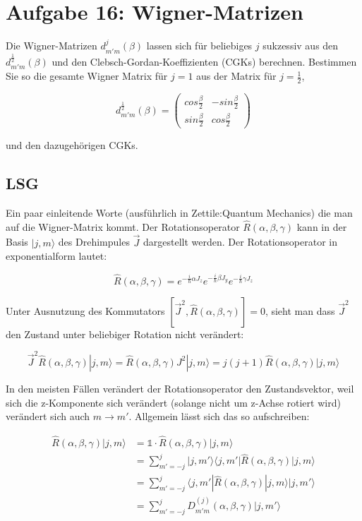 



\section*{Aufgabe 16: Wigner-Matrizen}

Die Wigner-Matrizen \(d_{m'm}^{j}(\beta)\) lassen sich für beliebiges \(j\) sukzessiv aus den \(d_{m'm}^{\frac{1}{2}}(\beta)\) und den Clebsch-Gordan-Koeffizienten (CGKs) berechnen. Bestimmen Sie so die gesamte Wigner Matrix für \(j=1\) aus der Matrix für \(j=\frac{1}{2}\),

\[d_{m'm}^{\frac{1}{2}}(\beta) =\begin{pmatrix} cos\frac{\beta}{2}&-sin\frac{\beta}{2}\\sin\frac{\beta}{2}&cos\frac{\beta}{2} 
\end{pmatrix}\]




und den dazugehörigen CGKs.


\subsection*{LSG}

Ein paar einleitende Worte (ausführlich in Zettile:Quantum Mechanics) die man auf die Wigner-Matrix kommt. Der Rotationsoperator \(\hat R(\alpha, \beta,\gamma)\) kann in der Basis \(|j,m\rangle\) des Drehimpules \(\vec J\) dargestellt werden. Der Rotationsoperator in exponentialform lautet:

\[  \hat R(\alpha, \beta,\gamma) = e^{-\frac{i}{\hbar}\alpha J_z}  e^{-\frac{i}{\hbar}\beta J_y} e^{-\frac{i}{\hbar}\gamma J_z}\]

Unter Ausnutzung des Kommutators \([\vec J^2,\hat R(\alpha, \beta,\gamma)]=0\), sieht man dass \(\vec J^2\) den Zustand unter beliebiger Rotation nicht verändert:

\[ \vec J^2\hat R(\alpha, \beta,\gamma)|j,m\rangle = \hat R(\alpha, \beta,\gamma)J^2|j,m\rangle = j(j+1)\hat R(\alpha, \beta,\gamma)|j,m\rangle\]

In den meisten Fällen verändert der Rotationsoperator den Zustandsvektor, weil sich die z-Komponente sich verändert (solange nicht um z-Achse rotiert wird) verändert sich auch \(m\rightarrow m'\). Allgemein lässt sich das so aufschreiben:

\begin{align}
\hat R(\alpha, \beta,\gamma)|j,m\rangle &= \mathbb 1 \cdot \hat R(\alpha, \beta,\gamma)|j,m\rangle \\
&= \sum_{m'=-j}^j |j,m'\rangle\langle j,m'| \hat R(\alpha, \beta,\gamma)|j,m\rangle \\
&= \sum_{m'=-j}^j \langle j,m'|  \hat R(\alpha, \beta,\gamma)|j,m\rangle |j,m'\rangle\\
&= \sum_{m'=-j}^j D^{(j)}_{m'm}(\alpha, \beta,\gamma) |j,m'\rangle
\end{align}



